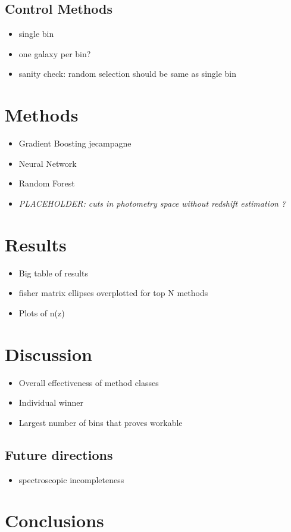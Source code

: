 \documentclass[twocolumn,twocolappendix]{aastex63}
\newcommand{\placeholder}[1]{\textit{PLACEHOLDER: #1}}
\begin{document}
\subsection{Control Methods}
\begin{itemize}
    \item single bin
    \item one galaxy per bin?
    \item sanity check: random selection should be same as single bin
\end{itemize}


\section{Methods}
\begin{itemize}
    \item Gradient Boosting \@ jecampagne
    \item Neural Network \@EiffL
    \item Random Forest
    \item \placeholder{cuts in photometry space without redshift estimation \@barber?}
\end{itemize}

\section{Results}
\begin{itemize}
    \item Big table of results
    \item fisher matrix ellipses overplotted for top N methods
    \item Plots of n(z)
\end{itemize}

\section{Discussion}
\begin{itemize}
    \item Overall effectiveness of method classes
    \item Individual winner
    \item Largest number of bins that proves workable
\end{itemize}

\subsection{Future directions}

\begin{itemize}
    \item spectroscopic incompleteness
\end{itemize}

\section{Conclusions}



\end{document}
